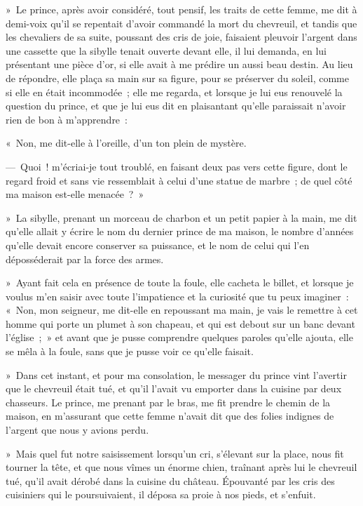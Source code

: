 \documentclass[french,twoside]{book} %
\begin{document}
» Le prince, après avoir considéré, tout pensif, les traits de cette femme, me dit à demi-voix qu’il se repentait d’avoir commandé la mort du chevreuil, et tandis que les chevaliers de sa suite, poussant des cris de joie, faisaient pleuvoir l’argent dans une cassette que la sibylle tenait ouverte devant elle, il lui demanda, en lui présentant une pièce d’or, si elle avait à me prédire un aussi beau destin. Au lieu de répondre, elle plaça sa main sur sa figure, pour se préserver du soleil, comme si elle en était incommodée ; elle me regarda, et lorsque je lui eus renouvelé la question du prince, et que je lui eus dit en plaisantant qu’elle paraissait n’avoir rien de bon à m’apprendre :\par
« Non, me dit-elle à l’oreille, d’un ton plein de mystère.\par
— Quoi ! m’écriai-je tout troublé, en faisant deux pas vers cette figure, dont le regard froid et sans vie ressemblait à celui d’une statue de marbre ; de quel côté ma maison est-elle menacée ? »\par
» La sibylle, prenant un morceau de charbon et un petit papier à la main, me dit qu’elle allait y écrire le nom du dernier prince de ma maison, le nombre d’années qu’elle devait encore conserver sa puissance, et le nom de celui qui l’en déposséderait par la force des armes.\par
» Ayant fait cela en présence de toute la foule, elle cacheta le billet, et lorsque je voulus m’en saisir avec toute l’impatience et la curiosité que tu peux imaginer : « Non, mon seigneur, me dit-elle en repoussant ma main, je vais le remettre à cet homme qui porte un plumet à son chapeau, et qui est debout sur un banc devant l’église ; » et avant que je pusse comprendre quelques paroles qu’elle ajouta, elle se mêla à la foule, sans que je pusse voir ce qu’elle faisait.\par
» Dans cet instant, et pour ma consolation, le messager du prince vint l’avertir que le chevreuil était tué, et qu’il l’avait vu emporter dans la cuisine par deux chasseurs. Le prince, me prenant par le bras, me fit prendre le chemin de la maison, en m’assurant que cette femme n’avait dit que des folies indignes de l’argent que nous y avions perdu.\par
» Mais quel fut notre saisissement lorsqu’un cri, s’élevant sur la place, nous fit tourner la tête, et que nous vîmes un énorme chien, traînant après lui le chevreuil tué, qu’il avait dérobé dans la cuisine du château. Épouvanté par les cris des cuisiniers qui le poursuivaient, il déposa sa proie à nos pieds, et s’enfuit.\par
\end{document}
